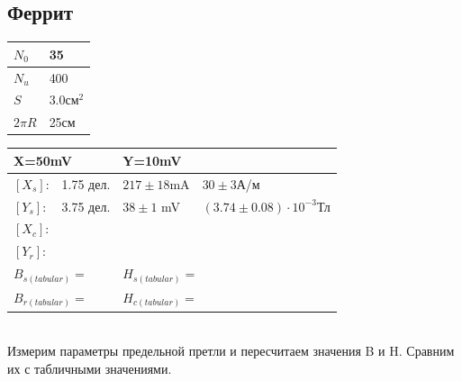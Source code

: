 \documentclass[12pt]{article}
\begin{document}
\subsection{Феррит}
\begin{minipage}{0.4\textwidth}
\begin{tabular}{|l|l|}
\hline
$N_0$ & 35        \\ \hline
$N_u$ & 400       \\ \hline
$S$   & 3.0см$^2$ \\ \hline
$2\pi R$ & 25см \\ \hline
\end{tabular}
\end{minipage}
\begin{minipage}{0.5\textwidth}
\begin{tabular}{|l|l|l|l|}
\hline
\multicolumn{2}{|l|}{X=50mV} & \multicolumn{2}{l|}{Y=10mV} \\ \hline
$[X_s]$:    & 1.75 дел.    & $217 \pm 18 $mA      &    $30 \pm 3$А/м  \\ \hline
$[Y_s]$:    & 3.75 дел.    & $38 \pm 1$ mV        &   $(3.74 \pm 0.08)\cdot10^{-3}$Тл   \\ \hline
$[X_c]$:    &              &                      &      \\ \hline
$[Y_r]$:    &              &                      &      \\ \hline
\multicolumn{2}{|l|}{$B_{s(tabular)} = $} & \multicolumn{2}{l|}{$H_{s(tabular)} = $} \\ \hline
\multicolumn{2}{|l|}{$B_{r(tabular)} = $} & \multicolumn{2}{l|}{$H_{c(tabular)} = $} \\ \hline
\end{tabular}
\end{minipage}\\

Измерим параметры предельной претли и пересчитаем значения B и H. Сравним их с табличными значениями.\\
\end{document}
